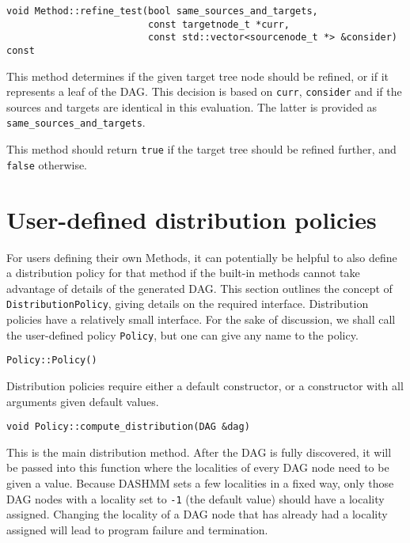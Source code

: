 \begin{lstlisting}
void Method::refine_test(bool same_sources_and_targets,
                         const targetnode_t *curr,
                         const std::vector<sourcenode_t *> &consider) const
\end{lstlisting}

\noindent
This method determines if the given target tree node should be refined, or if
it represents a leaf of the DAG. This decision is based on \texttt{curr},
\texttt{consider} and if the sources and targets are identical in this
evaluation. The latter is provided as \texttt{same\_sources\_and\_targets}.

This method should return \texttt{true} if the target tree should be refined
further, and \texttt{false} otherwise.



\section{User-defined distribution policies}

For users defining their own Methods, it can potentially be helpful to also
define a distribution policy for that method if the built-in methods cannot
take advantage of details of the generated DAG. This section outlines the
concept of \texttt{DistributionPolicy}, giving details on the required
interface. Distribution policies have a relatively small interface. For the
sake of discussion, we shall call the user-defined policy \texttt{Policy},
but one can give any name to the policy.

\begin{lstlisting}
Policy::Policy()
\end{lstlisting}

\noindent
Distribution policies require either a default constructor, or a constructor
with all arguments given default values.

\begin{lstlisting}
void Policy::compute_distribution(DAG &dag)
\end{lstlisting}

\noindent
This is the main distribution method. After the DAG is fully discovered, it will
be passed into this function where the localities of every DAG node need to be
given a value. Because DASHMM sets a few localities in a fixed way, only those
DAG nodes with a locality set to \texttt{-1} (the default value) should have
a locality assigned. Changing the locality of a DAG node that has already had
a locality assigned will lead to program failure and termination.


